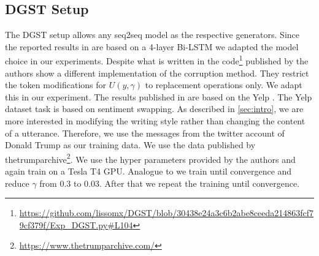 \documentclass[twocolumn]{tum-article}
\begin{document}
\subsection{DGST Setup}\label{sec:dgst_setup}
The DGST setup allows any seq2seq model as the respective generators. Since the reported results in \cite{li2020dgst} are based on a 4-layer Bi-LSTM we adapted the model choice in our experiments. Despite what is written in \cite{li2020dgst} the code\footnote{\url{https://github.com/lissomx/DGST/blob/30438e24a3c6b2abe8ceeda214863fcf79cf379f/Exp\_DGST.py\#L104}} published by the authors show a different implementation of the corruption method. They restrict the token modifications for $U(y, \gamma)$ to replacement operations only. We adapt this in our experiment. The results published in \cite{li2020dgst} are based on the Yelp \cite{li2018delete}. The Yelp dataset task is based on sentiment swapping. As described in \autoref{sec:intro}, we are more interested in modifying the writing style rather than changing the content of a utterance. Therefore, we use the messages from the twitter account of Donald Trump as our training data. We use the data published by thetrumparchive\footnote{\url{https://www.thetrumparchive.com/}}. We use the hyper parameters provided by the authors and again train on a Tesla T4 GPU. Analogue to \cite{li2020dgst} we train until convergence and reduce $\gamma$ from $0.3$ to $0.03$. After that we repeat the training until convergence.     
\end{document}
